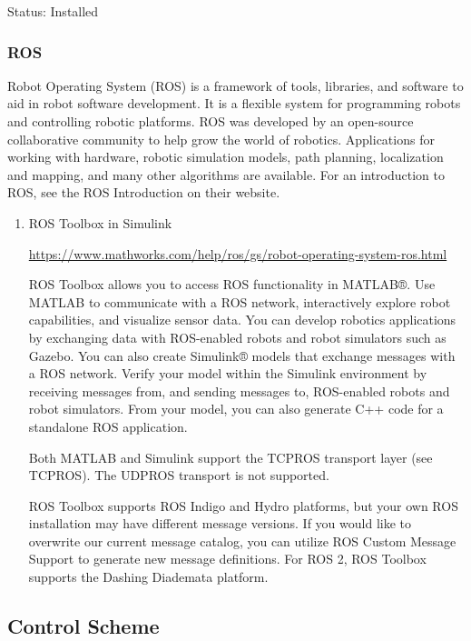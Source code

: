 \documentclass[unrestricted]{meetingnotesminutes}
\begin{document}
Status: Installed

\subsubsection{ROS}
\label{sec:org42eb7d0}
Robot Operating System (ROS) is a framework of tools, libraries, and software to aid in robot software development. It is a flexible system for programming robots and controlling robotic platforms. ROS was developed by an open-source collaborative community to help grow the world of robotics. Applications for working with hardware, robotic simulation models, path planning, localization and mapping, and many other algorithms are available. For an introduction to ROS, see the ROS Introduction on their website.

\begin{enumerate}
\item ROS Toolbox in Simulink
\label{sec:orgca215c6}

\url{https://www.mathworks.com/help/ros/gs/robot-operating-system-ros.html}

ROS Toolbox allows you to access ROS functionality in MATLAB®. Use MATLAB to communicate with a ROS network, interactively explore robot capabilities, and visualize sensor data. You can develop robotics applications by exchanging data with ROS-enabled robots and robot simulators such as Gazebo. You can also create Simulink® models that exchange messages with a ROS network. Verify your model within the Simulink environment by receiving messages from, and sending messages to, ROS-enabled robots and robot simulators. From your model, you can also generate C++ code for a standalone ROS application.

Both MATLAB and Simulink support the TCPROS transport layer (see TCPROS). The UDPROS transport is not supported.

ROS Toolbox supports ROS Indigo and Hydro platforms, but your own ROS installation may have different message versions. If you would like to overwrite our current message catalog, you can utilize ROS Custom Message Support to generate new message definitions. For ROS 2, ROS Toolbox supports the Dashing Diademata platform.
\end{enumerate}

\subsection{Control Scheme}
\label{sec:org327d897}
\end{document}
